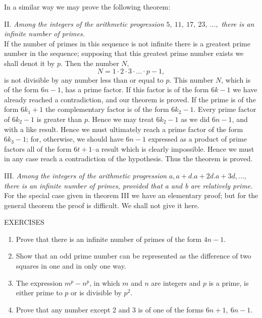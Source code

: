 \documentclass[oneside,12pt]{book}
\begin{document}
In a similar way we may prove the following theorem: \par 

II. \textit{Among the integers of the arithmetic progression} $5,\ 11,\ 17,\ 23,\ \dots,$ \textit{there is an infinite number of primes.}\\
If the number of primes in this sequence is not infinite there is a greatest prime number in the sequence; supposing that this greatest prime number exists we shall denot it by $p$. Then the number $N$, 
$$N=1\cdot 2\cdot 3\cdot \dots \cdot p-1,$$
is not divisible by any number less than or equal to $p$. This number $N$, which is of the form $6n-1$, has a prime factor. If this factor is of the form $6k-1$ we have already reached a contradiction, and our theorem is proved. If the prime is of the form $6k_1+1$ the complementary factor  is of the form $6k_2-1$. Every prime factor of $6k_2-1$ is greater than $p$. Hence we may treat $6k_2-1$ as we did $6n-1$, and with a like result. Hence we must ultimately reach a prime factor of the form $6k_3-1$; for, otherwise, we should have $6n-1$ expressed as a product of prime factors all of the form $6t+1$--a result which is clearly impossible. Hence we must in any case reach a contradiction of the hypothesis. Thus the theorem is proved. \par 

III. \textit{Among the integers of the arithmetic progression} $a, a+d. a+2d. a+3d, \dots,$ \textit{there is an infinite number of primes, provided that a and b are relatively prime.} \\ 
For the special case given in theorem III we have an elementary proof; but for the general theorem the proof is difficult. We shall not give it here. \par 

\begin{center}
    \uppercase{Exercises}
\end{center}
\begin{enumerate}
    \item Prove that there is an infinite number of primes of the form $4n-1$. 
    \item Show that an odd prime number can be represented as the difference of two squares in one and in only one way.
    \item The expression $m^p-n^p$, in which $m$ and $n$ are integers and $p$ is a prime, is either prime to $p$ or is divisible by $p^2$. 
    \item Prove that any number except 2 and 3 is of one of the forms $6n+1,\ 6n-1$. 
\end{enumerate}
\end{document}
